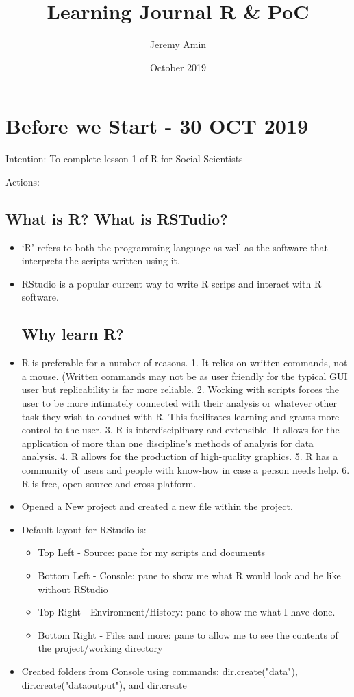 \documentclass{article}
\title{Learning Journal R \& PoC}
\author{Jeremy Amin}
\date{October 2019}
\begin{document}
\maketitle
\tableofcontents

\section{Before we Start - 30 OCT 2019}

Intention: To complete lesson 1 of R for Social Scientists

Actions:

\subsection{What is R? What is RSTudio?}
\begin{itemize}
    \item `R' refers to both the programming language as well as the software that interprets the scripts written using it.
    \item RStudio is a popular current way to write R scrips and interact with R software.
    
\subsection{Why learn R?}

    \item R is preferable for a number of reasons. 1. It relies on written commands, not a mouse. (Written commands may not be as user friendly for the typical GUI user but replicability is far more reliable. 2. Working with scripts forces the user to be more intimately connected with their analysis or whatever other task they wish to conduct with R. This facilitates learning and grants more control to the user. 3. R is interdisciplinary and extensible. It allows for the application of more than one discipline's methods of analysis for data analysis. 4. R allows for the production of high-quality graphics. 5. R has a community of users and people with know-how in case a person needs help. 6. R is free, open-source and cross platform.
    \item Opened a New project and created a new file within the project.
    \item Default layout for RStudio is: 
    \begin{itemize}
        \item Top Left - Source: pane for my scripts and documents
        \item Bottom Left - Console: pane to show me what R would look and be like without RStudio
        \item Top Right - Environment/History: pane to show me what I have done.
        \item Bottom Right - Files and more: pane to allow me to see the contents of the project/working directory
    \end{itemize}
\item Created folders from Console using commands: dir.create("data"), dir.create("data\textunderscore output"), and dir.create


\end{itemize}
\end{document}
